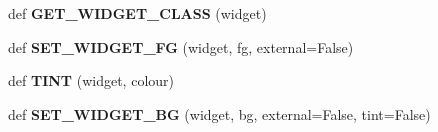\begin{DoxyCompactItemize}
\mbox{\label{class_python_01_g_u_i_1_1appjar_1_1gui_a419464353a01f6b32feb092bcda913bd}} 
def {\bfseries G\+E\+T\+\_\+\+W\+I\+D\+G\+E\+T\+\_\+\+C\+L\+A\+SS} (widget)
\item 
\mbox{\label{class_python_01_g_u_i_1_1appjar_1_1gui_a72e7cebddc628044e2a2edaf2c5f8a8f}} 
def {\bfseries S\+E\+T\+\_\+\+W\+I\+D\+G\+E\+T\+\_\+\+FG} (widget, fg, external=False)
\item 
\mbox{\label{class_python_01_g_u_i_1_1appjar_1_1gui_accd872e483f515a77e42cf9e23a9cfe3}} 
def {\bfseries T\+I\+NT} (widget, colour)
\item 
\mbox{\label{class_python_01_g_u_i_1_1appjar_1_1gui_a4668e4e801aa067b88fd58381c02b417}} 
def {\bfseries S\+E\+T\+\_\+\+W\+I\+D\+G\+E\+T\+\_\+\+BG} (widget, bg, external=False, tint=False)
\end{DoxyCompactItemize}
